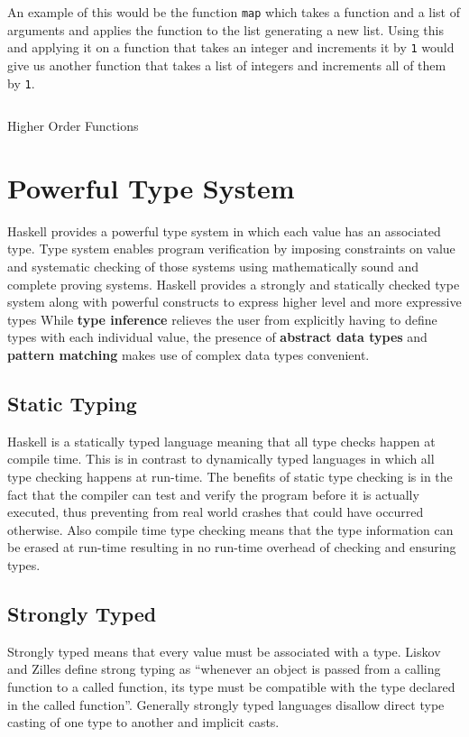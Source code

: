 An example of this would be the function \texttt{map} which takes a function and a list of arguments and applies the function to the list
generating a new list. Using this and applying it on a function that takes an integer and increments it by \texttt{1} would give us another
function that takes a list of integers and increments all of them by \texttt{1}.

\begin{listing}
\inputminted{haskell}{hs/higher_order.hs}
\caption{Higher Order Functions}
\end{listing}

\section{Powerful Type System}
Haskell provides a powerful type system in which each value has an associated type.
Type system enables program verification by imposing constraints on value and systematic checking of those systems using mathematically
sound and complete proving systems.
Haskell provides a strongly and statically checked type system along with powerful constructs to express higher level and more expressive types
While \textbf{type inference} relieves the user from explicitly having to define types with each individual value,
the presence of \textbf{abstract data types} and \textbf{pattern matching} makes use of complex data types convenient.

\subsection{Static Typing}
Haskell is a statically typed language meaning that all type checks happen at compile time. This is in contrast to dynamically typed languages
in which all type checking happens at run-time. The benefits of static type checking is in the fact that the compiler can test and verify the
program before it is actually executed, thus preventing from real world crashes that could have occurred otherwise.
Also compile time type checking means that the type information can be erased at run-time resulting in no run-time overhead of checking
and ensuring types.

\subsection{Strongly Typed}
Strongly typed means that every value must be associated with a type.
Liskov and Zilles define strong typing as ``whenever an object is passed from a calling function to a called function,
 its type must be compatible with the type declared in the called function''\cite{LZ74}.
Generally strongly typed languages disallow direct type casting of one type to another and implicit casts.

